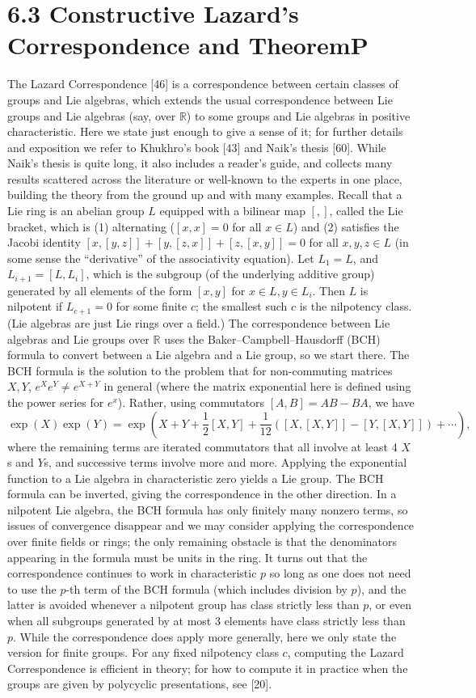 \section*{6.3 Constructive Lazard's Correspondence and TheoremP}
The Lazard Correspondence [46] is a correspondence between certain classes of groups and Lie algebras, which extends the usual correspondence between Lie groups and Lie algebras (say, over $\mathbb R$) to some groups and Lie algebras in positive characteristic. Here we state just enough to give a sense of it; for further details and exposition we refer to Khukhro's book [43] and Naik's thesis [60]. While Naik's thesis is quite long, it also includes a reader's guide, and collects many results scattered across the literature or well-known to the experts in one place, building the theory from the ground up and with many examples.
Recall that a Lie ring is an abelian group $L$ equipped with a bilinear map $[,]$, called the Lie bracket, which is (1) alternating ($[x,x]=0$ for all $x\in L$) and (2) satisfies the Jacobi identity $[x,[y,z]]+[y,[z,x]]+[z,[x,y]]=0$ for all $x,y,z\in L$ (in some sense the ``derivative'' of the associativity equation). Let $L_1=L$, and $L_{i+1}=[L,L_i]$, which is the subgroup (of the underlying additive group) generated by all elements of the form $[x,y]$ for $x\in L,y\in L_i$. Then $L$ is nilpotent if $L_{c+1}=0$ for some finite $c$; the smallest such $c$ is the nilpotency class. (Lie algebras are just Lie rings over a field.)
The correspondence between Lie algebras and Lie groups over $\mathbb R$ uses the Baker--Campbell--Hausdorff (BCH) formula to convert between a Lie algebra and a Lie group, so we start there. The BCH formula is the solution to the problem that for non-commuting matrices $X,Y$, $e^Xe^Y\ne e^{X+Y}$ in general (where the matrix exponential here is defined using the power series for $e^x$). Rather, using commutators $[A,B]=AB-BA$, we have
\[\exp(X)\exp(Y)=\exp\left(X+Y+\frac12[X,Y]+\frac1{12}([X,[X,Y]]-[Y,[X,Y]])+\cdots\right),\]
where the remaining terms are iterated commutators that all involve at least 4 $X$s and $Y$s, and successive terms involve more and more. Applying the exponential function to a Lie algebra in characteristic zero yields a Lie group. The BCH formula can be inverted, giving the correspondence in the other direction.
In a nilpotent Lie algebra, the BCH formula has only finitely many nonzero terms, so issues of convergence disappear and we may consider applying the correspondence over finite fields or rings; the only remaining obstacle is that the denominators appearing in the formula must be units in the ring. It turns out that the correspondence continues to work in characteristic $p$ so long as one does not need to use the $p$-th term of the BCH formula (which includes division by $p$), and the latter is avoided whenever a nilpotent group has class strictly less than $p$, or even when all subgroups generated by at most 3 elements have class strictly less than $p$. While the correspondence does apply more generally, here we only state the version for finite groups. For any fixed nilpotency class $c$, computing the Lazard Correspondence is efficient in theory; for how to compute it in practice when the groups are given by polycyclic presentations, see [20].
